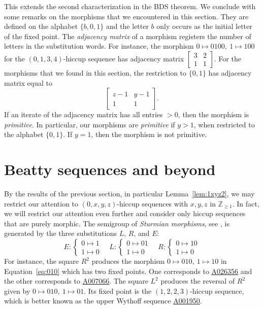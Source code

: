 \documentclass[12pt,reqno]{article}
\newcommand{\seqnum}[1]{\href{https://oeis.org/#1}{\rm \underline{#1}}}
\begin{document}
This extends the second characterization in the BDS theorem. We conclude with some remarks
on the morphisms that we encountered in this section. They are defined on the alphabet 
$\{b,0,1\}$ and the letter $b$ only occurs as the initial letter of the fixed point.
The \emph{adjacency matrix} of a morphism registers the number of letters in the
substitution words. For instance, the morphism $0\mapsto 0100,\ 1\mapsto 100$ for
the $(0,1,3,4)$-hiccup sequence has
adjacency matrix $\begin{bmatrix}
3 & 2 \\
1 & 1
\end{bmatrix}
$.
For the morphisms that we found in this section, the restriction to $\{0,1\}$ 
has adjacency matrix equal to 
\begin{equation}\label{eq:adjacency}
\begin{bmatrix}
z-1 & y-1 \\
1 & 1
\end{bmatrix}.
\end{equation}
If an iterate of the adjacency matrix has all entries $>0$,
then the morphism is \emph{primitive}. 
In particular, our morphisms are \emph{primitive} if $y>1$,
when restricted to the alphabet $\{0,1\}$. 
If $y=1$, then the morphism is not primitive.


\section{Beatty sequences and beyond}

By the results of the previous section, in particular Lemma~\ref{lem:1xyz2}, we may
restrict our attention to $(0,x,y,z)$-hiccup sequences with $x,y,z$ in $\mathbb Z_{\geq 1}$.
In fact, we will restrict our attention even further and consider only 
hiccup sequences that are purely morphic.
\medbreak
The semigroup of \emph{Sturmian morphisms}, see \cite[p. 72] {Berstel}, is generated by 
the three substitutions \(L\), \(R\), and \(E\):
\hspace{-0.2cm}
\[
E:
\begin{cases}
0 \mapsto 1 \\
1 \mapsto 0
\end{cases}
\quad
L: 
\begin{cases}
0 \mapsto 01 \\
1 \mapsto 0
\end{cases}
\quad
R:
\begin{cases}
0 \mapsto 10 \\
1 \mapsto 0
\end{cases}
\]
\noindent
For instance, the square
$R^2$ produces the morphism $0\mapsto 010,\ 1\mapsto 10$ in Equation~\ref{eq:010} 
which has two fixed points. One corresponds to \seqnum{A026356}
and the other corresponds to \seqnum{A007066}. The square $L^2$ produces the
reversal of $R^2$ given by $0\mapsto 010,\ 1\mapsto 01$. Its fixed point is the $(1,2,2,3)$-hiccup
sequence, which is better known as the upper Wythoff sequence \seqnum{A001950}.
\end{document}
